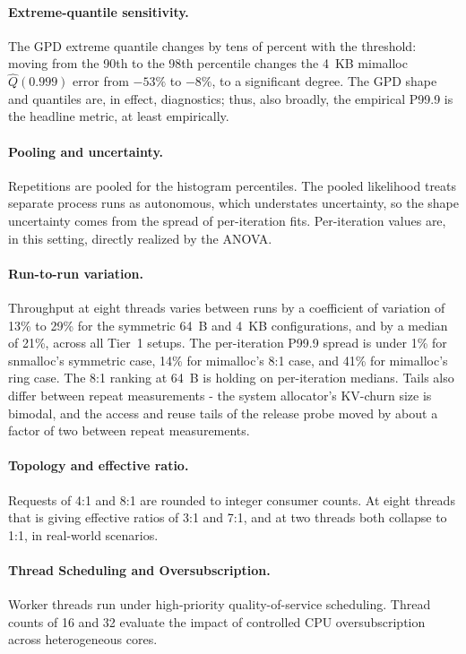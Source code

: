 \paragraph{Extreme-quantile sensitivity.} The GPD extreme quantile changes by tens of percent with the threshold:
moving from the 90th to the 98th percentile changes the 4~KB mimalloc $\hat Q(0.999)$ error from $-53\%$ to $-8\%$, to a significant degree.
The GPD shape and quantiles are, in effect, diagnostics; thus, also broadly, the empirical P99.9 is the headline metric, at least empirically.

\paragraph{Pooling and uncertainty.} Repetitions are pooled for the histogram percentiles. The pooled likelihood
treats separate process runs as autonomous, which understates uncertainty, so the shape uncertainty comes from
the spread of per-iteration fits. Per-iteration values are, in this setting, directly realized by the ANOVA.

\paragraph{Run-to-run variation.} Throughput at eight threads varies between runs by a coefficient of variation of
13\% to 29\% for the symmetric 64~B and 4~KB configurations, and by a median of 21\%, across all Tier~1
setups. The per-iteration P99.9 spread is under 1\% for snmalloc's symmetric case, 14\% for mimalloc's 8:1
case, and 41\% for mimalloc's ring case. The 8:1 ranking at 64~B is holding on per-iteration medians. Tails also differ
between repeat measurements - the system allocator's KV-churn size is bimodal, and the access and reuse tails of the release
probe moved by about a factor of two between repeat measurements.

\paragraph{Topology and effective ratio.} Requests of 4:1 and 8:1 are rounded to integer consumer counts. At eight
threads that is giving effective ratios of 3:1 and 7:1, and at two threads both collapse to 1:1, in real-world scenarios.

\paragraph{Thread Scheduling and Oversubscription.} Worker threads run under high-priority quality-of-service scheduling. Thread counts of 16 and 32 evaluate the impact of controlled CPU oversubscription across heterogeneous cores.

